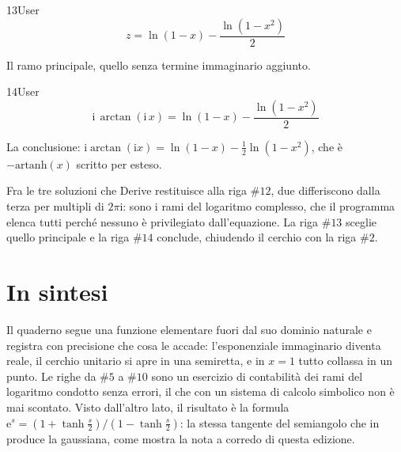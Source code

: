 \begin{espr}{13}{User}{}
\[
z = \ln\!\left(1 - x\right) - \frac{\ln\!\left(1 - x^{2}\right)}{2}
\]
\end{espr}
Il ramo principale, quello senza termine immaginario aggiunto.

\begin{espr}{14}{User}{\verificata}
\[
\mathrm{i}\, \arctan\!\left(\mathrm{i}\, x\right) = \ln\!\left(1 - x\right) - \frac{\ln\!\left(1 - x^{2}\right)}{2}
\]
\end{espr}
La conclusione: $\mathrm{i}\arctan(\mathrm{i}x)=\ln(1-x)-\tfrac12\ln(1-x^2)$, che è $-\mathrm{artanh}(x)$ scritto per esteso.


Fra le tre soluzioni che Derive restituisce alla riga $\#12$, due differiscono dalla terza per multipli di $2\pi\mathrm{i}$: sono i rami del logaritmo complesso, che il programma elenca tutti perché nessuno è privilegiato dall'equazione. La riga $\#13$ sceglie quello principale e la riga $\#14$ conclude, chiudendo il cerchio con la riga $\#2$.

\section*{In sintesi}

Il quaderno segue una funzione elementare fuori dal suo dominio naturale e registra con precisione che cosa le accade: l'esponenziale immaginario diventa reale, il cerchio unitario si apre in una semiretta, e in $x=1$ tutto collassa in un punto. Le righe da $\#5$ a $\#10$ sono un esercizio di contabilità dei rami del logaritmo condotto senza errori, il che con un sistema di calcolo simbolico non è mai scontato. Visto dall'altro lato, il risultato è la formula $\mathrm{e}^{s}=\left(1+\tanh\tfrac s2\right)/\left(1-\tanh\tfrac s2\right)$: la stessa tangente del semiangolo che in  produce la gaussiana, come mostra la nota a corredo di questa edizione.

